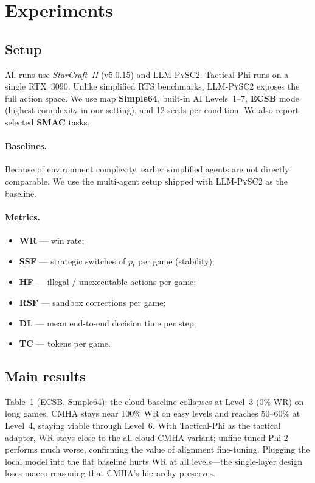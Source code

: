 \documentclass[11pt,a4paper]{article}
\begin{document}
\section{Experiments}

\subsection{Setup}

All runs use \textit{StarCraft~II} (v5.0.15) and \textsc{LLM-PySC2}. Tactical-Phi runs on a single RTX~3090. Unlike simplified RTS benchmarks, \textsc{LLM-PySC2} exposes the full action space. We use map \textbf{Simple64}, built-in AI Levels~1--7, \textbf{ECSB} mode (highest complexity in our setting), and 12 seeds per condition. We also report selected \textbf{SMAC} tasks.

\paragraph{Baselines.}
Because of environment complexity, earlier simplified agents are not directly comparable. We use the multi-agent setup shipped with \textsc{LLM-PySC2} as the baseline.

\paragraph{Metrics.}
\begin{itemize}
  \item \textbf{WR} — win rate;
  \item \textbf{SSF} — strategic switches of $p_t$ per game (stability);
  \item \textbf{HF} — illegal / unexecutable actions per game;
  \item \textbf{RSF} — sandbox corrections per game;
  \item \textbf{DL} — mean end-to-end decision time per step;
  \item \textbf{TC} — tokens per game.
\end{itemize}

\subsection{Main results}

Table~1 (ECSB, Simple64): the cloud baseline collapses at Level~3 (0\% WR) on long games. CMHA stays near 100\% WR on easy levels and reaches 50--60\% at Level~4, staying viable through Level~6. With Tactical-Phi as the tactical adapter, WR stays close to the all-cloud CMHA variant; unfine-tuned Phi-2 performs much worse, confirming the value of alignment fine-tuning. Plugging the local model into the flat baseline hurts WR at all levels—the single-layer design loses macro reasoning that CMHA's hierarchy preserves.
\end{document}

